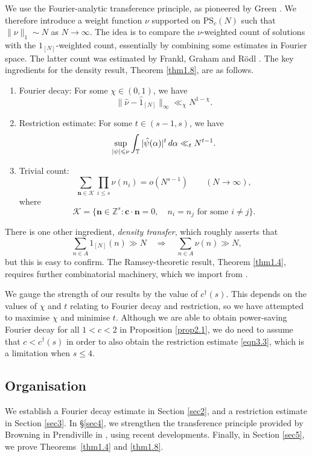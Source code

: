 \documentclass[12pt, reqno]{amsart}
\theoremstyle{definition}
\theoremstyle{remark}
\numberwithin{equation}{section}
\theoremstyle{definition}
\def\alp{{\alpha}} \def\bfalp{{\boldsymbol \alpha}}
\def\le{\leqslant} \def\ge{\geqslant} \def\pleq{\preccurlyeq} \def\ple{\prec}
\def\d{{\,{\rm d}}}
\def \bZ {\mathbb Z}
\def \bT {\mathbb T}
\def \bc {\mathbf c}
\def \bn {{\mathbf{n}}}
\def \cK {\mathcal K}
\def \PS {\mathrm{PS}}
\begin{document}
We use the Fourier-analytic transference principle, as pioneered by Green \cite{Gre2005}. 
We therefore introduce a weight function $\nu$ supported on $\PS_c(N)$ such that $\| \nu \|_1 \sim N$ as $N \to \infty$. The idea is to compare the $\nu$-weighted count of solutions with the $1_{[N]}$-weighted count, essentially by combining some estimates in Fourier space. The latter count was estimated by Frankl, Graham and R\"odl \cite{FGR1988}. The key ingredients for the density result, Theorem \ref{thm1.8}, are as follows.
\begin{enumerate}
\item Fourier decay: For some $\chi \in (0,1)$, we have
\[
\| \hat \nu - \hat 1_{[N]} \|_\infty \ll_\chi N^{1-\chi}.
\]

\item Restriction estimate: For some $t \in (s-1,s)$, we have
\[
\sup_{|\psi| \le \nu} \int_\bT |\hat \psi(\alp)|^t \d \alp \ll_t N^{t-1}.
\]

\item Trivial count:
\[
\sum_{\bn \in \cK} \prod_{i \le s} \nu(n_i) = o(N^{s-1}) \qquad (N \to \infty),
\]
where 
\[
\cK = \{ \bn \in \bZ^s: \bc \cdot \bn = 0, \quad
n_i = n_j \text{ for some } i \ne j \}.
\]
\end{enumerate}
There is one other ingredient, \emph{density transfer}, which roughly asserts that
\[
\sum_{n \in A} 1_{[N]}(n) \gg N \quad \Longrightarrow \quad \sum_{n \in A} \nu(n) \gg N,
\]
but this is easy to confirm. The Ramsey-theoretic result, Theorem \ref{thm1.4}, requires further combinatorial machinery, which we import from \cite{CLP2021}.

We gauge the strength of our results by the value of $c^\dag(s)$. This depends on the values of $\chi$ and $t$ relating to 
Fourier decay and restriction, so we have attempted to maximise $\chi$ and minimise $t$. 
Although we are able to obtain power-saving Fourier decay for all $1<c<2$ in Proposition \ref{prop2.1}, we do need to assume that $c < c^\dag(s)$ in order to also obtain the restriction estimate \eqref{eqn3.3}, which is a limitation when $s \le 4$.

\subsection*{Organisation}

We establish a Fourier decay estimate in Section \ref{sec2}, and a restriction estimate in Section \ref{sec3}. In \S \ref{sec4}, we strengthen
the transference principle provided by Browning in Prendiville in \cite[Proposition 2.8]{BP2017}, using recent developments. Finally, in Section \ref{sec5}, we prove Theorems~\ref{thm1.4} and \ref{thm1.8}.
\end{document}
